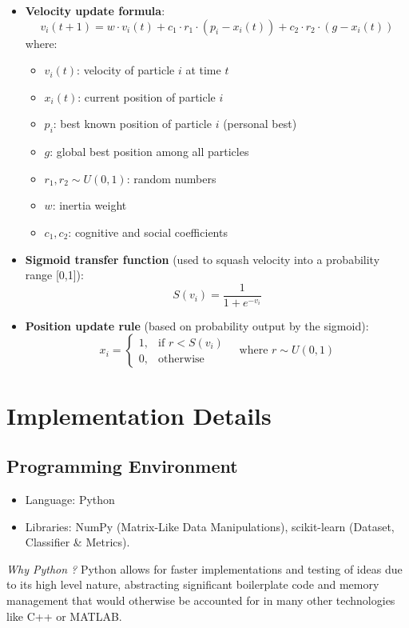 \documentclass[12pt]{article}
\begin{document}
\begin{itemize}
    \item \textbf{Velocity update formula}:
    \[
    v_i(t+1) = w \cdot v_i(t) + c_1 \cdot r_1 \cdot (p_i - x_i(t)) + c_2 \cdot r_2 \cdot (g - x_i(t))
    \]
    where:
    \begin{itemize}
        \item \( v_i(t) \): velocity of particle \(i\) at time \(t\)
        \item \( x_i(t) \): current position of particle \(i\)
        \item \( p_i \): best known position of particle \(i\) (personal best)
        \item \( g \): global best position among all particles
        \item \( r_1, r_2 \sim U(0, 1) \): random numbers
        \item \( w \): inertia weight
        \item \( c_1, c_2 \): cognitive and social coefficients
    \end{itemize}
    
    \item \textbf{Sigmoid transfer function} (used to squash velocity into a probability range [0,1]):
    \[
    S(v_i) = \frac{1}{1 + e^{-v_i}}
    \]
    
    \item \textbf{Position update rule} (based on probability output by the sigmoid):
    \[
    x_{i} = 
    \begin{cases}
    1, & \text{if } r < S(v_i) \\
    0, & \text{otherwise}
    \end{cases}
    \quad \text{where } r \sim U(0, 1)
    \]
\end{itemize}


\section{Implementation Details}
\subsection{Programming Environment}
\begin{itemize}
    \item Language: Python
    \item Libraries: NumPy (Matrix-Like Data Manipulations), scikit-learn (Dataset, Classifier \& Metrics).
\end{itemize}
\textit{Why Python ?} Python allows for faster implementations and testing of ideas due to its high level nature, abstracting significant boilerplate code and memory management that would otherwise be accounted for in many other technologies like C++ or MATLAB. 
\end{document}
